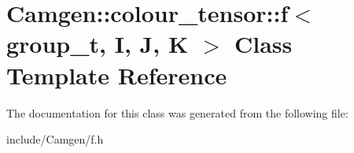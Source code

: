 \hypertarget{a00213}{\section{Camgen\-:\-:colour\-\_\-tensor\-:\-:f$<$ group\-\_\-t, I, J, K $>$ Class Template Reference}
\label{a00213}
}


The documentation for this class was generated from the following file\-:\begin{DoxyCompactItemize}
\item 
include/\-Camgen/f.\-h\end{DoxyCompactItemize}
